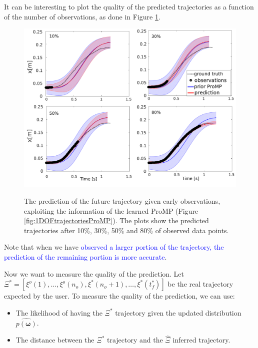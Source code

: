 \documentclass[utf8]{frontiersSCNS} %
\newcommand{\rev}[1]{\textcolor{blue}{#1}}
\begin{document}
It can be interesting to plot the quality of the predicted trajectories as a function of the number of observations, as done in Figure \ref{fig:1DOFtrajectoriesPredictions}.

\begin{figure}[h]
\centering
{
\includegraphics[width=15cm]{img/1DOFtrajectoriesPredictionsV2.pdf}
}
\caption{The prediction of the future trajectory given early observations, exploiting the information of the learned ProMP (Figure \ref{fig:1DOFtrajectoriesProMP}). The plots show the predicted trajectories after 10\%, 30\%, 50\% and 80\% of observed data points.}
\label{fig:1DOFtrajectoriesPredictions}
\end{figure}

Note that when we have \rev{observed a larger portion of the trajectory, the prediction of the remaining portion is more accurate}.

Now we want to measure the quality of the prediction. Let $\Xi^* = [\xi^o(1),\ldots, \xi^o({n_o}), \xi^*(n_o+1),\ldots, \xi^*(t^*_f)]$ be the real trajectory expected by the user. 
To measure the quality of the prediction, we can use:
\begin{itemize}
\item The likelihood of having the $\Xi^*$ trajectory given the updated distribution $\hat{p(\boldsymbol{\omega})}$.
\item The distance between the $\Xi^*$ trajectory and the  $\hat{\Xi}$ inferred trajectory.
\end{itemize}
\end{document}
